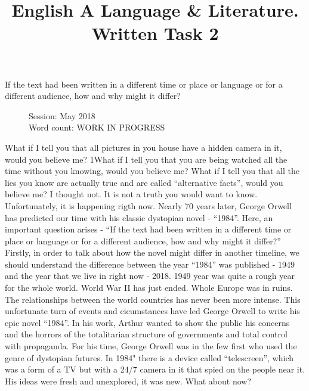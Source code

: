 \documentclass[a4paper,12pt]{article}
\title{English A Language \& Literature. Written Task 2}
\date{}
\author{}
\begin{document}
\maketitle
\begin{center}
If the text had been written in a different time or place or language or for a different audience, how and why might it differ?
\end{center}
\begin{flushleft}
\begin{figure}
Session: May 2018\\
Word count: WORK IN PROGRESS\\
\end{figure}
\end{flushleft}
\newpage



What if I tell you that all pictures in you house have a hidden camera in it, would you believe me? 1What if I tell you that you are being watched all the time without you knowing, would you believe me?  What if I tell you that all the lies you know are actually true and are called ``alternative facts'', would you believe me? I thought not. It is not a truth you would want to know. Unfortunately, it is happening rigth now. Nearly 70 years later, George Orwell has predicted our time with his classic dystopian novel - ``1984''. Here, an important question arises - ``If the text had been written in a different time or place or language or for a different audience, how and why might it differ?'' \\

Firstly, in order to talk about how the novel might differ in another timeline, we should understand the difference between the year ``1984'' was published - 1949 and the year that we live in right now - 2018. 1949 year was quite a rough year for the whole world. World War II has just ended. Whole Europe was in ruins. The relationships between the world countries has never been more intense. This unfortunate turn of events and cicumstances have led George Orwell to write his epic novel ``1984''. In his work, Arthur wanted to show the public his concerns and the horrors of the totalitarian structure of governments and total control with propaganda. For his time, George Orwell was in the few first who used the genre of dystopian futures. In 1984" there is a device called ``telescreen'', which was a form of a TV but with a 24/7 camera in it that spied on the people near it. His ideas were fresh and unexplored, it was new. What about now?\\
\end{document}
